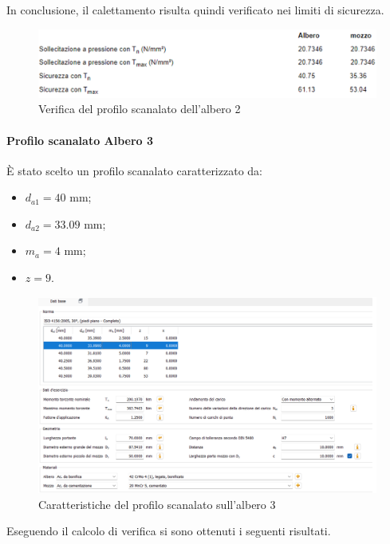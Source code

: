 In conclusione, il calettamento risulta quindi verificato nei limiti di sicurezza.
\begin{figure}[h]
    \centering
    \includegraphics[scale=0.5]{Immagini/RisultatiScanalato2.png}
    \caption{Verifica del profilo scanalato dell'albero 2}
    \label{fig:RisultatiScanalato2}
\end{figure}

\paragraph{Profilo scanalato Albero 3}

È stato scelto un profilo scanalato caratterizzato da:
\begin{itemize}
    \item $d_{a1}=40$ mm;
    \item $d_{a2}=33.09$ mm;
    \item $m_a=4$ mm;
    \item $z=9$.
\end{itemize}

\begin{figure}[h]
    \centering
    \includegraphics[scale=0.5]{Immagini/Scanalato3.png}
    \caption{Caratteristiche del profilo scanalato sull'albero 3}
    \label{fig:Scanalato3}
\end{figure}
\newpage
Eseguendo il calcolo di verifica si sono ottenuti i seguenti risultati.

